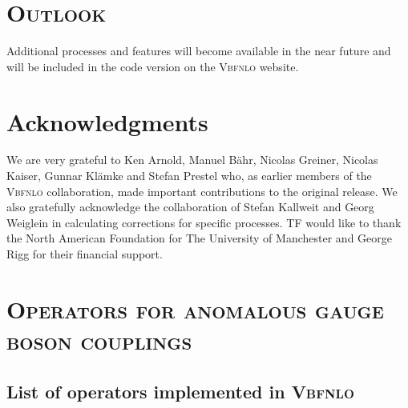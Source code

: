 \documentclass[english,12pt]{article}
\begin{document}

\newpage

\section{\textsc{Outlook}}

Additional processes and features will become available in the near future and will be included in the code version on the \textsc{Vbfnlo} website.  


\section*{Acknowledgments}

We are very grateful to Ken Arnold, Manuel B\"ahr, Nicolas Greiner, Nicolas
Kaiser, Gunnar Kl\"amke and Stefan Prestel who, as earlier members of the
\textsc{Vbfnlo} collaboration, made important contributions to the original
release.  We also gratefully acknowledge the collaboration of Stefan Kallweit
and Georg Weiglein in calculating corrections for specific processes.  
TF would like to thank the North American Foundation for The University of
Manchester and George Rigg for their financial support. 




\newpage

\appendix

\section{\textsc{Operators for anomalous gauge boson couplings}}

\subsection{List of operators implemented in \textsc{Vbfnlo}}
\label{listofoperators}
\end{document}
